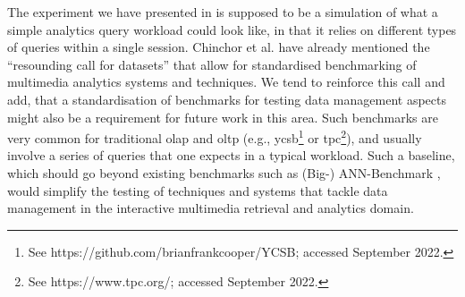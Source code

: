 The experiment we have presented in  is supposed to be a simulation of what a simple analytics query workload could look like, in that it relies on different types of queries within a single session. Chinchor et al. \cite{Chinchor:2010Multimedia} have already mentioned the ``resounding call for datasets'' that allow for standardised benchmarking of multimedia analytics systems and techniques. We tend to reinforce this call and add, that a standardisation of benchmarks for testing data management aspects might also be a requirement for future work in this area. Such benchmarks are very common for traditional \acrshort{olap} and \acrshort{oltp} (e.g., \acrshort{ycsb}\footnote{See https://github.com/brianfrankcooper/YCSB; accessed September 2022.} or \acrshort{tpc}\footnote{See https://www.tpc.org/; accessed September 2022.}), and usually involve a series of queries that one expects in a typical workload. Such a baseline, which should go beyond existing benchmarks such as (Big-) ANN-Benchmark \cite{Aumueller:2017ANN,Simhadri:2022Results}, would simplify the testing of techniques and systems that tackle data management in the interactive multimedia retrieval and analytics domain.